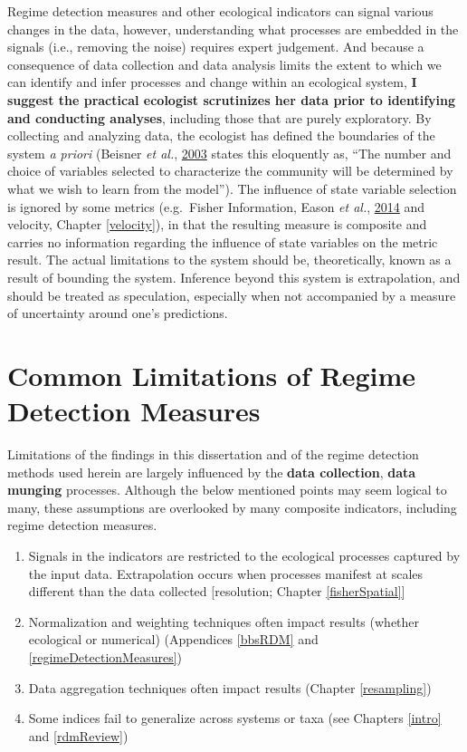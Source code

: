 \documentclass[12pt,twoside,openany]{reedthesis}
\providecommand{\tightlist}{%
  \setlength{\itemsep}{0pt}\setlength{\parskip}{0pt}}
\begin{document}
Regime detection measures and other ecological indicators can signal various changes in the data, however, understanding what processes are embedded in the signals (i.e., removing the noise) requires expert judgement. And because a consequence of data collection and data analysis limits the extent to which we can identify and infer processes and change within an ecological system, \textbf{I suggest the practical ecologist scrutinizes her data prior to identifying and conducting analyses}, including those that are purely exploratory. By collecting and analyzing data, the ecologist has defined the boundaries of the system \emph{a priori} (Beisner \emph{et al.}, \protect\hyperlink{ref-beisner2003alternative}{2003} states this eloquently as, ``The number and choice of variables selected to characterize the community will be determined by what we wish to learn from the model''). The influence of state variable selection is ignored by some metrics (e.g.~Fisher Information, Eason \emph{et al.}, \protect\hyperlink{ref-eason2014managing}{2014} and velocity, Chapter \ref{velocity}), in that the resulting measure is composite and carries no information regarding the influence of state variables on the metric result.
The actual limitations to the system should be, theoretically, known as a result of bounding the system. Inference beyond this system is extrapolation, and should be treated as speculation, especially when not accompanied by a measure of uncertainty around one's predictions.

\hypertarget{common-limitations-of-regime-detection-measures}{%
\section{Common Limitations of Regime Detection Measures}\label{common-limitations-of-regime-detection-measures}}

Limitations of the findings in this dissertation and of the regime detection methods used herein are largely influenced by the \textbf{data collection}, \textbf{data munging} processes. Although the below mentioned points may seem logical to many, these assumptions are overlooked by many composite indicators, including regime detection measures.
\begin{enumerate}
\def\labelenumi{\arabic{enumi}.}
\tightlist
\item
  Signals in the indicators are restricted to the ecological processes captured by the input data. Extrapolation occurs when processes manifest at scales different than the data collected {[}resolution; Chapter \ref{fisherSpatial}{]}
\item
  Normalization and weighting techniques often impact results (whether ecological or numerical) (Appendices \ref{bbsRDM} and \ref{regimeDetectionMeasures})
\item
  Data aggregation techniques often impact results (Chapter \ref{resampling})
\item
  Some indices fail to generalize across systems or taxa (see Chapters \ref{intro} and \ref{rdmReview})
\end{enumerate}
\appendix
\end{document}
